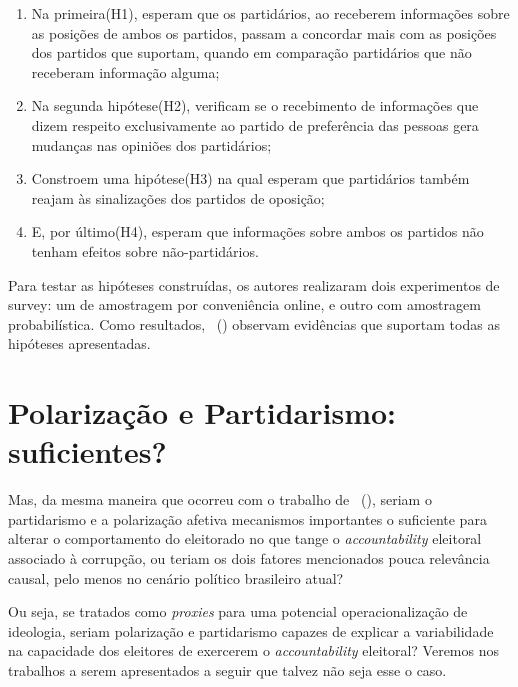 \documentclass[
	12pt,				%
	openright,			%
	twoside,			%
	a4paper,			%
	openany,
	english,			%
	brazil				%
	]{abntex2}
\begin{document}
\begin{enumerate}

\item Na primeira(H1), esperam que os partidários, ao receberem informações sobre as posições de ambos os partidos, passam a concordar mais com as posições dos partidos que suportam, quando em comparação partidários que não receberam informação alguma;

\item Na segunda hipótese(H2), verificam se o recebimento de informações que dizem respeito exclusivamente ao partido de preferência das pessoas gera mudanças nas opiniões dos partidários;

\item Constroem uma hipótese(H3) na qual esperam que partidários também reajam às sinalizações dos partidos de oposição;

\item E, por último(H4), esperam que informações sobre ambos os partidos não tenham efeitos sobre não-partidários.

\end{enumerate}

Para testar as hipóteses construídas, os autores\cite{Samuels2014Jan} realizaram dois experimentos de survey: um de amostragem por conveniência online, e outro com amostragem probabilística. Como resultados, ~(\citeyear{Samuels2014Jan}) observam evidências que suportam todas as hipóteses apresentadas.

\section{Polarização e Partidarismo: suficientes?}

Mas, da mesma maneira que ocorreu com o trabalho de ~(\citeyear{ferraz2008exposing}), seriam o partidarismo e a polarização afetiva mecanismos importantes o suficiente para alterar o comportamento do eleitorado no que tange o \textit{accountability} eleitoral associado à corrupção, ou teriam os dois fatores mencionados pouca relevância causal, pelo menos no cenário político brasileiro atual?

Ou seja, se tratados como \textit{proxies} para uma potencial operacionalização de ideologia, seriam polarização e partidarismo capazes de explicar a variabilidade na capacidade dos eleitores de exercerem o \textit{accountability} eleitoral? Veremos nos trabalhos a serem apresentados a seguir que talvez não seja esse o caso.
\end{document}
